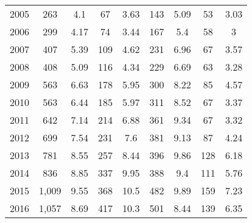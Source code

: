 \begin{table}[htbp]
\begin{tabular}{l*{8}{c}}
2005      &      263&      4.1&       67&     3.63&      143&     5.09&       53&     3.03\\
2006      &      299&     4.17&       74&     3.44&      167&      5.4&       58&        3\\
2007      &      407&     5.39&      109&     4.62&      231&     6.96&       67&     3.57\\
2008      &      408&     5.09&      116&     4.34&      229&     6.69&       63&     3.28\\
2009      &      563&     6.63&      178&     5.95&      300&     8.22&       85&     4.57\\
2010      &      563&     6.44&      185&     5.97&      311&     8.52&       67&     3.37\\
2011      &      642&     7.14&      214&     6.88&      361&     9.34&       67&     3.32\\
2012      &      699&     7.54&      231&      7.6&      381&     9.13&       87&     4.24\\
2013      &      781&     8.55&      257&     8.44&      396&     9.86&      128&     6.18\\
2014      &      836&     8.85&      337&     9.95&      388&      9.4&      111&     5.76\\
2015      &    1,009&     9.55&      368&     10.5&      482&     9.89&      159&     7.23\\
2016      &    1,057&     8.69&      417&     10.3&      501&     8.44&      139&     6.35\\
\hline\hline
\end{tabular}
\end{table}
